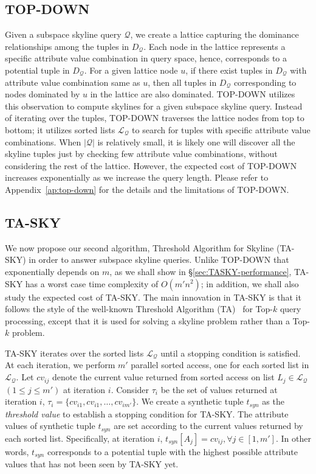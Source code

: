 \subsection{TOP-DOWN}\label{sec:topdown}

 Given a subspace skyline query $\mathcal{Q}$, we create a lattice capturing the dominance relationships among the tuples in $D_{\mathcal{Q}}$. Each node in the lattice represents a specific attribute value combination in query space, hence, corresponds to a potential tuple in $D_{\mathcal{Q}}$. For a given lattice node $u$, if there exist tuples in $D_{\mathcal{Q}}$ with attribute value combination same as $u$, then all tuples in $D_{\mathcal{Q}}$ corresponding to nodes dominated by $u$ in the lattice are also dominated. TOP-DOWN utilizes this observation to compute skylines for a given subspace skyline query. Instead of iterating over the tuples, TOP-DOWN traverses the lattice nodes from top to bottom; it utilizes sorted lists $\mathcal{L_Q}$ to search for tuples with specific attribute value combinations. When $|\mathcal{Q}|$ is relatively small, it is likely one will discover all the skyline tuples just by checking few attribute value combinations, without considering the rest of the lattice. However, the expected cost of TOP-DOWN increases exponentially as we increase the query  length.
Please refer to Appendix~\ref{ap:top-down} for the details and the limitations of TOP-DOWN.

\subsection{TA-SKY}\label{sec:TASky}
We now propose our second algorithm, Threshold Algorithm for Skyline (TA-SKY) in order to answer subspace skyline queries. Unlike TOP-DOWN that exponentially depends on $m$, as we shall show in \S\ref{sec:TASKY-performance}, TA-SKY has a worst case time complexity of $O(m'n^2)$; in addition, we shall also study the expected cost of TA-SKY.
The main innovation in TA-SKY is that it follows the style of the well-known Threshold Algorithm (TA)~\cite{fagin2003optimal} for Top-$k$ query processing, except that it is used for solving a skyline problem rather than a Top-$k$ problem. 

TA-SKY iterates over the sorted lists $\mathcal{L_Q}$ until a stopping condition is satisfied. At each iteration, we perform $m'$ parallel sorted access, one for each sorted list in $\mathcal{L_Q}$. Let $cv_{ij}$ denote the current value returned from sorted access on list $L_j \in \mathcal{L_Q}$ $(1 \leq j \leq m')$ at iteration $i$. Consider $\tau_i$ be the set of values returned at iteration $i$, $\tau_i = \{cv_{i1}, cv_{i1}, \ldots, cv_{im'}\}$. We create a synthetic tuple $t_{syn}$ as the \textit{threshold value} to establish a stopping condition for TA-SKY. The attribute values of synthetic tuple $t_{syn}$ are set according to the current values returned by each sorted list. Specifically, at iteration $i$, $t_{syn}[A_j] = cv_{ij}, \forall j \in [1, m']$. In other words, $t_{syn}$ corresponds to a potential tuple with the highest possible attribute values that has not
been seen by TA-SKY yet. 

